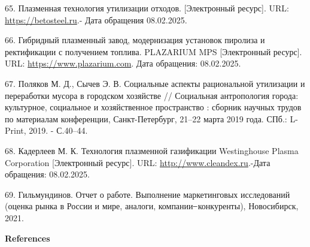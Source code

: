 \begin{references}
65. Плазменная технология утилизации отходов. {[}Электронный ресурс{]}.
URL:
\href{https://betosteel.ru/articles/plazmennaya-texnologiya-utilizacii-otxodov.html}{https://betosteel.ru}.-
Дата обращения 08.02.2025.

66. Гибридный плазменный завод, модернизация установок пиролиза и
ректификации с получением топлива. PLAZARIUM MPS {[}Электронный
ресурс{]}. URL:
\href{https://www.plazarium.com/ru/products/plasma-pyrolysis-units/plazarium-mps/}{https://www.plazarium.com}.
Дата обращения: 08.02.2025.

67. Поляков М. Д., Сычев Э. В. Социальные аспекты рациональной
утилизации и переработки мусора в городском хозяйстве // Социальная
антропология города: культурное, социальное и хозяйственное пространство
: сборник научных трудов по материалам конференции, Санкт-Петербург,
21--22 марта 2019 года. СПб.: L-Print, 2019. - С.40--44.

68. Кадерлеев М. К. Технология плазменной газификации Westinghouse
Plasma Corporation {[}Электронный ресурс{]}. URL:
\href{http://www.cleandex.ru/articles/2016/03/07/zavody_po_pererabotke_othodov_proizvodstva_i_potrebleniya_v_elektroenergiyu}{http://www.cleandex.ru}.-Дата
обращения: 08.02.2025.

69. Гильмундинов. Отчет о работе. Выполнение маркетинговых исследований
(оценка рынка в России и мире, аналоги, компании ̶ конкуренты),
Новосибирск, 2021.
\end{references}

\begin{center}
{\bfseries References}
\end{center}

